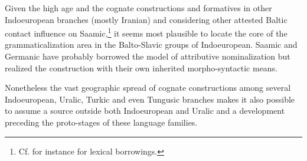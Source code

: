 Given the high age and the cognate constructions and formatives in other Indoeuropean branches (mostly Iranian) and considering other attested Baltic contact influence on Saamic,\footnote{Cf. for instance \citealt{riesler2009} for lexical borrowings.} it seems most plausible to locate the core of the grammaticalization area in the Balto-Slavic groups of Indoeuropean. Saamic and Germanic have probably borrowed the model of attributive nominalization but realized the construction with their own inherited morpho-syntactic means.

Nonetheless the vast geographic spread of cognate constructions among several Indoeuropean, Uralic, Turkic and even Tungusic branches makes it also possible to assume a source outside both Indoeuropean and Uralic and a development preceding the proto-stages of these language families.
